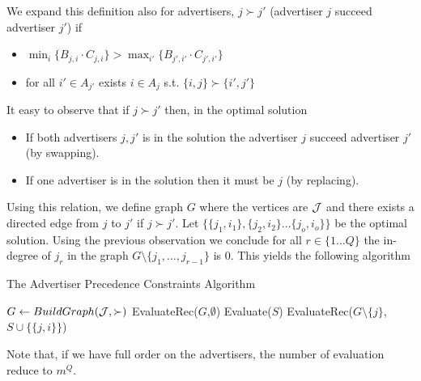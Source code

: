 We expand this definition also for advertisers, $j \succ j'$ (advertiser $j$ succeed advertiser $j'$) if
\begin{itemize}
	\item $\min_i \{B_{j,i}\cdot C_{j,i} \} > \max_{i'} \{B_{j',i'}\cdot C_{j',i'} \}$
	\item for all $i' \in A_{j'}$ exists $i \in A_{j}$ s.t. $\{i,j\} \succ \{i',j'\}$
\end{itemize}

It easy to observe that if  $j \succ j'$ then, in the optimal solution
\begin{itemize}
	\item If both advertisers $j,j'$ is in the solution the advertiser $j$ succeed advertiser $j'$ (by swapping).
	\item If one advertiser is in the solution then it must be $j$ (by replacing).
\end{itemize}

Using this relation, we define graph $G$ where the vertices are ${\cal J}$ and there exists a directed edge from $j$ to $j'$ if $j \succ j'$. 
Let $\{ \{j_1,i_1\},\{j_2,i_2\}\dots \{j_o,i_o\} \}$ be the optimal solution. Using the previous observation we conclude for all $r\in \{1\dots Q\}$ the in-degree of $j_r$ in the graph $G\setminus \{j_1,\dots,j_{r-1}\}$ is $0$. This yields the following algorithm

\begin{algorithm}
	\caption{The Advertiser Precedence Constraints Algorithm}\label{euclid}
	\begin{algorithmic}[1]
		\State $G \gets BuildGraph({\cal J},\succ)$
		\State EvaluateRec($G$,$\emptyset$)
		\State Evaluate($S$)
		\State \Return 
		\EndIf
			\State EvaluateRec($G\setminus \{j\}$, $S \cup \{\{j,i\}\}$)
		\EndFor
		\EndFor
		\EndProcedure
	\end{algorithmic}
\end{algorithm}

Note that, if we have full order on the advertisers, the number of evaluation reduce to $m^Q$. 

